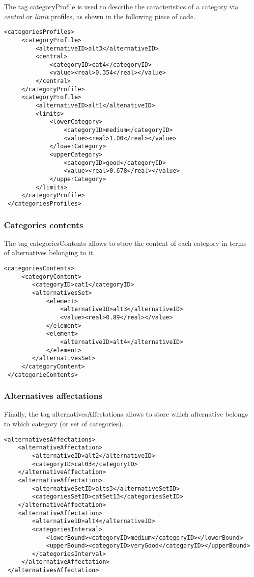 \documentclass[a4paper,oneside,10 pt]{article}
\newcommand{\code}{\asciifamily}
\begin{document}
The tag {\code categoryProfile} is used to describe the caracteristics of a category via \textit{central} or \textit{limit} profiles, as shown in the following piece of code. 
{\code
\begin{lstlisting}[style=prototype]
 <categoriesProfiles>
	 <categoryProfile>
		 <alternativeID>alt3</alternativeID>
		 <central>
			 <categoryID>cat4</categoryID>
			 <value><real>0.354</real></value>
		 </central>
	 </categoryProfile>
	 <categoryProfile>
		 <alternativeID>alt1</altenativeID>
		 <limits>
			 <lowerCategory>
				 <categoryID>medium</categoryID>
				 <value><real>1.00</real></value>
			 </lowerCategory>
			 <upperCategory>
				 <categoryID>good</categoryID>
				 <value><real>0.678</real></value>
			 </upperCategory>
		 </limits>
	 </categoryProfile>
 </categoriesProfiles>
\end{lstlisting}
}

\subsubsection{Categories contents}

The tag {\code categoriesContents} allows to store the content of each category in terms of alternatives belonging to it. 
{\code
\begin{lstlisting}[style=prototype]
 <categoriesContents>
	 <categoryContent>
		<categoryID>cat1</categoryID>
		<alternativesSet>
			<element>
				<alternativeID>alt3</alternativeID>
				<value><real>0.89</real></value>
			</element>
			<element>
				<alternativeID>alt4</alternativeID>
			</element>
		</alternativesSet>
	 </categoryContent>
 </categorieContents>
\end{lstlisting}
}

\subsubsection{Alternatives affectations}

Finally, the tag {\code alternativesAffectations} allows to store which alternative belongs to which category (or set of categories). 
{\code
\begin{lstlisting}[style=prototype]
 <alternativesAffectations>
	<alternativeAffectation>
		<alternativeID>alt2</alternativeID>
		<categoryID>cat03</categoryID>
	</alternativeAffectation>
	<alternativeAffectation>
		<alternativeSetID>alts3</alternativeSetID>
		<categoriesSetID>catSet13</categoriesSetID>
	</alternativeAffectation>
	<alternativeAffectation>
		<alternativeID>alt4</alternativeID>
		<categoriesInterval>
			<lowerBound><categoryID>medium</categoryID></lowerBound>
			<upperBound><categoryID>veryGood</categoryID></upperBound>
		</categoriesInterval>
	 </alternativeAffectation>
 </alternativesAffectation>
\end{lstlisting}
}
\end{document}

